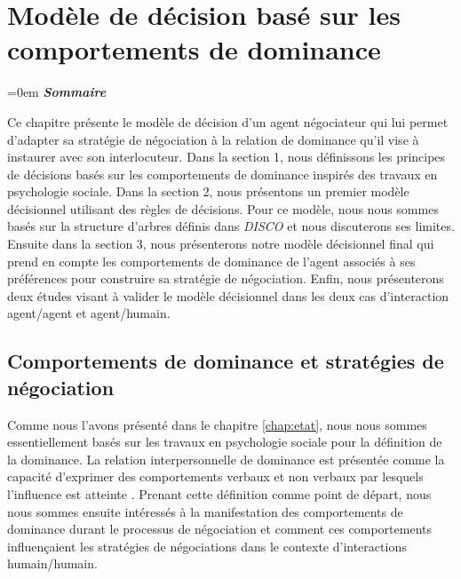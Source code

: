 \chapter{Modèle de décision basé sur les comportements de dominance}
	\label{chap:dec}
	
	\begingroup
	\parindent=0em
	\emph{\textbf{Sommaire}}
	\localtableofcontents 
	\clearpage
	\endgroup
	
	Ce chapitre présente le modèle de décision d'un agent négociateur qui lui permet d'adapter sa stratégie de négociation à la relation de dominance qu'il vise à instaurer avec son interlocuteur. Dans la section 1, nous définissons les principes de décisions basés sur les comportements de dominance inspirés des travaux en psychologie sociale. Dans la section 2, nous présentons un premier modèle décisionnel utilisant des règles de décisions.  Pour ce modèle, nous nous sommes basés sur la structure d'arbres définis dans \emph{DISCO} \cite{rich09} et nous discuterons ses limites. Ensuite dans la section 3, nous présenterons notre modèle décisionnel final qui prend en compte les comportements de dominance de l'agent associés à ses préférences pour construire sa stratégie de négociation. Enfin, nous présenterons deux études visant à valider le modèle décisionnel dans les deux cas d'interaction agent/agent et agent/humain.
	
	
	\section{Comportements de dominance et stratégies de négociation}
	\label{chap:domer}
	Comme nous l'avons présenté dans le chapitre \ref{chap:etat}, nous nous sommes essentiellement basés sur les travaux en psychologie sociale pour la définition de la dominance. 
	La relation interpersonnelle de dominance est présentée comme la capacité d'exprimer des comportements verbaux et non verbaux par lesquels l'influence est atteinte \cite{burgoon2006nonverbal}. Prenant cette définition comme point de départ, nous nous sommes ensuite intéressés à la manifestation des comportements de dominance durant le processus de négociation et comment ces comportements influençaient les stratégies de négociations dans le contexte d'interactions humain/humain. 
	
